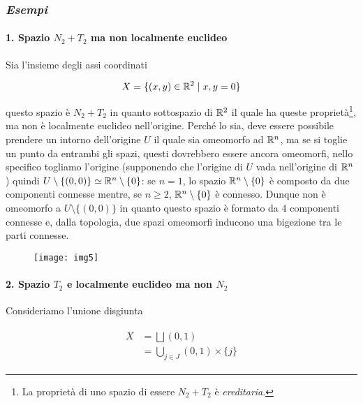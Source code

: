 \subsubsection{\textit{Esempi}}

\paragraph{1. Spazio $ N_{2} + T_{2} $ ma non localmente euclideo} 

Sia l'insieme degli assi coordinati

\begin{equation}
	X = \{ (x,y) \in \mathbb{R}^{2} \mid x,y = 0 \}
\end{equation}

questo spazio è $ N_{2} + T_{2} $ in quanto sottospazio di $ \mathbb{R}^{2} $ il quale ha queste proprietà\footnote{%
	La proprietà di uno spazio di essere $ N_{2} + T_{2} $ è \textit{ereditaria}.%
}, ma non è localmente euclideo nell'origine. Perché lo sia, deve essere possibile prendere un intorno dell'origine $ U $ il quale sia omeomorfo ad $ \mathbb{R}^{n} $, ma se si toglie un punto da entrambi gli spazi, questi dovrebbero essere ancora omeomorfi, nello specifico togliamo l'origine (supponendo che l'origine di $ U $ vada nell'origine di $ \mathbb{R}^{n} $) quindi $ U \setminus \{(0,0)\} \simeq \mathbb{R}^{n} \setminus \{0\} $: se $ n=1 $, lo spazio $ \mathbb{R}^{n} \setminus \{0\} $ è composto da due componenti connesse mentre, se $ n \geqslant 2 $, $ \mathbb{R}^{n} \setminus \{0\} $ è connesso. Dunque non è omeomorfo a $ U \setminus \{(0,0)\} $ in quanto questo spazio è formato da 4 componenti connesse e, dalla topologia, due spazi omeomorfi inducono una bigezione tra le parti connesse.

\begin{figure}[H]
	\centering
	\texttt{[image: img5]}
\end{figure}

\paragraph{2. Spazio $ T_{2} $ e localmente euclideo ma non $ N_{2} $}

Consideriamo l'unione disgiunta

\begin{align}
	\begin{split}
		X &= \bigsqcup (0,1)\\
		&= \bigcup_{j \in J} (0,1) \times \{j\}
	\end{split}
\end{align}


